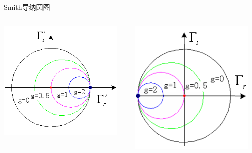 \begin{frame}{Smith导纳圆图}
  \begin{columns}
    \begin{column}{0.5\linewidth}
      \includegraphics[width=6cm]{Cha4//equal_G_circle1.png}
    \end{column}
    \begin{column}{0.5\linewidth}
      \includegraphics[width=6cm]{Cha4//equal_G_circle2.png}
    \end{column}
  \end{columns}
  
  
\end{frame}

